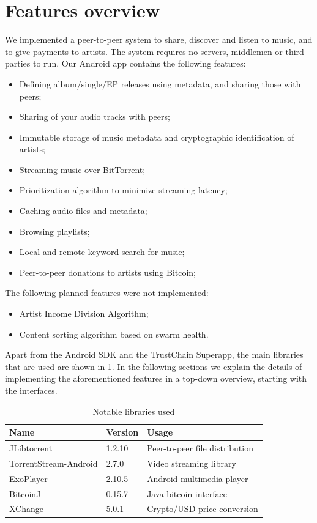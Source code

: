 \section{Features overview}
We implemented a peer-to-peer system to share, discover and listen to music, and to give payments to artists. The system requires no servers, middlemen or third parties to run. Our Android app contains the following features:
\begin{itemize}
    \item Defining album/single/EP releases using metadata, and sharing those with peers;
    \item Sharing of your audio tracks with peers;
    \item Immutable storage of music metadata and cryptographic identification of artists;
    \item Streaming music over BitTorrent;
    \item Prioritization algorithm to minimize streaming latency;
    \item Caching audio files and metadata;
    \item Browsing playlists;
    \item Local and remote keyword search for music;
    \item Peer-to-peer donations to artists using Bitcoin;
\end{itemize}
The following planned features were not implemented:
\begin{itemize}
    \item Artist Income Division Algorithm;
    \item Content sorting algorithm based on swarm health.
\end{itemize}
Apart from the Android SDK and the TrustChain Superapp, the main libraries that are used are shown in \ref{tab:library-usage}. In the following sections we explain the details of implementing the aforementioned features in a top-down overview, starting with the interfaces.
\begin{table}[]
\begin{tabular}{|l|l|l|}
\hline
Name                  & Version & Usage                          \\ \hline
JLibtorrent           & 1.2.10  & Peer-to-peer file distribution \\ \hline
TorrentStream-Android & 2.7.0   & Video streaming library        \\ \hline
ExoPlayer             & 2.10.5  & Android multimedia player      \\ \hline
BitcoinJ              & 0.15.7  & Java bitcoin interface         \\ \hline
XChange               & 5.0.1   & Crypto/USD price conversion    \\ \hline
\end{tabular}
\caption{Notable libraries used}
\label{tab:library-usage}
\end{table}
